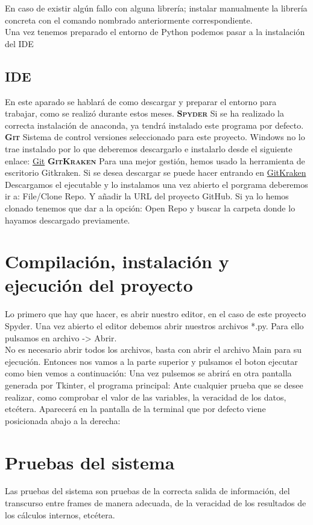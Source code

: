 En caso de existir algún fallo con alguna librería; instalar manualmente la librería concreta con el comando nombrado anteriormente correspondiente.\\
Una vez tenemos preparado el entorno de Python podemos pasar a la instalación del IDE
\subsection{IDE}
En este aparado se hablará de como descargar y preparar el entorno para trabajar, como se realizó durante estos meses.
\textbf{\textsc{Spyder}}
Si se ha realizado la correcta instalación de anaconda, ya tendrá instalado este programa por defecto.
\textbf{\textsc{Git}}
Sistema de control versiones seleccionado para este proyecto. Windows no lo trae instalado por lo que deberemos descargarlo e instalarlo desde el siguiente enlace: \href{https://git-scm.com/}{Git}
\textbf{\textsc{GitKraken}}
Para una mejor gestión, hemos usado la herramienta de escritorio Gitkraken. Si se desea descargar se puede hacer entrando en \href{https://gitkraken.com/}{GitKraken}
Descargamos el ejecutable y lo instalamos una vez abierto el porgrama deberemos ir a: File/Clone Repo. Y añadir la URL del proyecto GitHub. Si ya lo hemos clonado tenemos que dar a la opción: Open Repo y buscar la carpeta donde lo hayamos descargado previamente.
\section{Compilación, instalación y ejecución del proyecto}
Lo primero que hay que hacer, es abrir nuestro editor, en el caso de este proyecto Spyder. Una vez abierto el editor debemos abrir nuestros archivos *.py. Para ello pulsamos en archivo -> Abrir.\\
No es necesario abrir todos los archivos, basta con abrir el archivo Main para su ejecución. Entonces nos vamos a la parte superior y pulsamos el boton ejecutar como bien vemos a continuación:
Una vez pulsemos se abrirá en otra pantalla generada por Tkinter, el programa principal:
Ante cualquier prueba que se desee realizar, como comprobar el valor de las variables, la veracidad de los datos, etcétera. Aparecerá en la pantalla de la terminal que por defecto viene posicionada abajo a la derecha:
\section{Pruebas del sistema}
Las pruebas del sistema son pruebas de la correcta salida de información, del transcurso entre frames de manera adecuada, de la veracidad de los resultados de los cálculos internos, etcétera.
